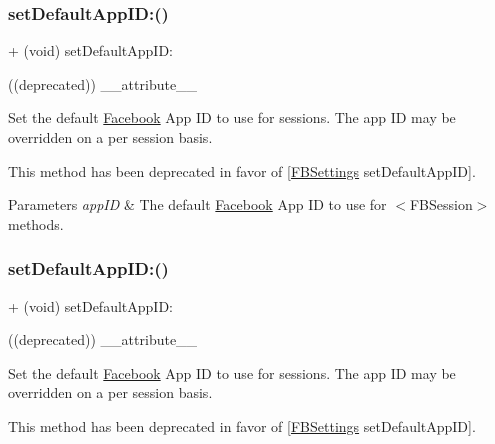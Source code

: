 \subsubsection{\texorpdfstring{set\+Default\+App\+I\+D\+:()}{setDefaultAppID:()}\hspace{0.1cm}{\footnotesize\ttfamily [1/5]}}
{\footnotesize\ttfamily + (void) set\+Default\+App\+I\+D\+: \begin{DoxyParamCaption}\item[{((deprecated))}]{\+\_\+\+\_\+attribute\+\_\+\+\_\+ }\end{DoxyParamCaption}}

Set the default \hyperlink{interfaceFacebook}{Facebook} App ID to use for sessions. The app ID may be overridden on a per session basis.

This method has been deprecated in favor of \mbox{[}\hyperlink{interfaceFBSettings}{F\+B\+Settings} set\+Default\+App\+ID\mbox{]}.


\begin{DoxyParams}{Parameters}
{\em app\+ID} & The default \hyperlink{interfaceFacebook}{Facebook} App ID to use for $<$\+F\+B\+Session$>$ methods. \\
\hline
\end{DoxyParams}
\mbox{\label{interfaceFBSession_afb4f41ffcd4d824a16147cb41b932a32}} 
\subsubsection{\texorpdfstring{set\+Default\+App\+I\+D\+:()}{setDefaultAppID:()}\hspace{0.1cm}{\footnotesize\ttfamily [2/5]}}
{\footnotesize\ttfamily + (void) set\+Default\+App\+I\+D\+: \begin{DoxyParamCaption}\item[{((deprecated))}]{\+\_\+\+\_\+attribute\+\_\+\+\_\+ }\end{DoxyParamCaption}}

Set the default \hyperlink{interfaceFacebook}{Facebook} App ID to use for sessions. The app ID may be overridden on a per session basis.

This method has been deprecated in favor of \mbox{[}\hyperlink{interfaceFBSettings}{F\+B\+Settings} set\+Default\+App\+ID\mbox{]}.


